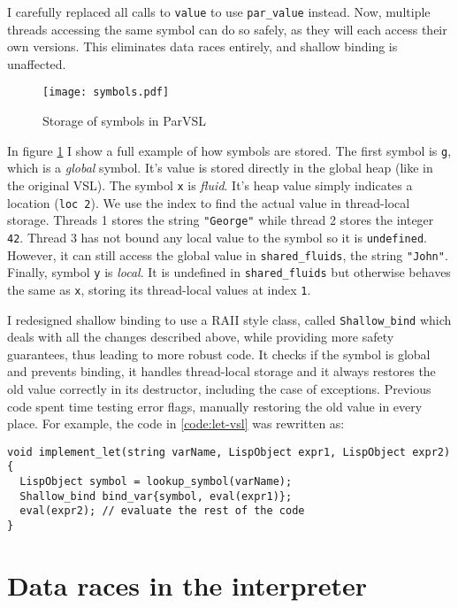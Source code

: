 I carefully replaced all calls to \texttt{value} to use \texttt{par\_value} instead.
Now, multiple threads accessing the same symbol can do so safely,
as they will each access their own versions. This eliminates data races entirely,
and shallow binding is unaffected.

\begin{figure}[H]
  \centering
  \texttt{[image: symbols.pdf]}
  \caption{Storage of symbols in ParVSL}
  \label{fig:symbols}
\end{figure}

In figure \ref{fig:symbols} I show a full example of how symbols are stored. The first symbol is \texttt{g}, which
is a \emph{global} symbol. It's value is stored directly in the global heap (like in the original VSL). The symbol \texttt{x}
is \emph{fluid}. It's heap value simply indicates a location (\texttt{loc 2}). We use the index to find the actual value
in thread-local storage. Threads 1 stores the string \texttt{"George"} while thread 2 stores the integer \texttt{42}.
Thread 3 has not bound any local value to the symbol so it is \texttt{undefined}. However, it can still access the
global value in \verb|shared_fluids|, the string \verb|"John"|. Finally, symbol \verb|y| is \emph{local}. It is
undefined in \verb|shared_fluids| but otherwise behaves the same as \verb|x|, storing its thread-local values at
index \verb|1|.

I redesigned shallow binding to use a RAII style class, called \verb|Shallow_bind| which deals with all the changes
described above, while providing more safety guarantees, thus leading to more robust code. It checks if the symbol is global and prevents binding,
it handles thread-local storage and it always restores the old value correctly in its destructor, including the
case of exceptions. Previous code spent time testing error flags, manually restoring the old value in every place.
For example, the code in \ref{code:let-vsl} was rewritten as:
\begin{code}
\begin{verbatim}
void implement_let(string varName, LispObject expr1, LispObject expr2) {
  LispObject symbol = lookup_symbol(varName);
  Shallow_bind bind_var{symbol, eval(expr1)};
  eval(expr2); // evaluate the rest of the code
}
\end{verbatim}
  \caption{Implementation of \texttt{let} in ParVSL.}
  \label{code:let-parvsl}
\end{code}

\section{Data races in the interpreter}
\label{sec:datarace}

